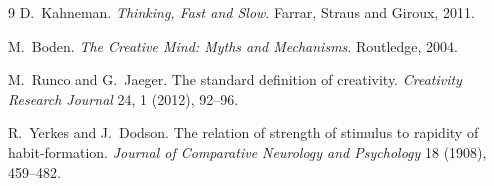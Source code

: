 \documentclass[sigconf,nonacm]{acmart}
\begin{document}
\appendix


\begin{thebibliography}{9}
D.~Kahneman.
\newblock \textit{Thinking, Fast and Slow}.
\newblock Farrar, Straus and Giroux, 2011.

M.~Boden.
\newblock \textit{The Creative Mind: Myths and Mechanisms}.
\newblock Routledge, 2004.

M.~Runco and G.~Jaeger.
\newblock The standard definition of creativity.
\newblock \textit{Creativity Research Journal} 24, 1 (2012), 92--96.

R.~Yerkes and J.~Dodson.
\newblock The relation of strength of stimulus to rapidity of habit-formation.
\newblock \textit{Journal of Comparative Neurology and Psychology} 18 (1908), 459--482.
\end{thebibliography}
\end{document}
